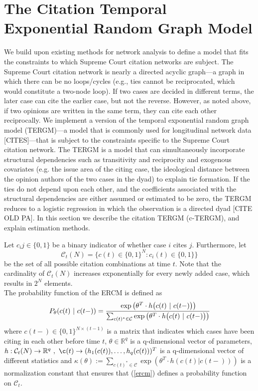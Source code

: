 \documentclass[headsepline=true, abstracton]{scrartcl}
\begin{document}
 \section{The Citation Temporal Exponential Random Graph Model}
We build upon existing methods for network analysis to define a model that fits the constraints to which Supreme Court citation networks are subject. The Supreme Court citation network is nearly a directed acyclic graph---a graph in which there can be no loops/cycles (e.g., ties cannot be reciprocated, which would constitute a two-node loop). If two cases are decided in different terms, the later case can cite the earlier case, but not the reverse. However, as noted above, if two opinions are written in the same term, they can cite each other reciprocally. We implement a version of the temporal exponential random graph model (TERGM)---a model that is commonly used for longitudinal network data [CITES]---that is subject to the constraints specific to the Supreme Court citation network. The TERGM is a model that can simultaneously incorporate structural dependencies such as transitivity and reciprocity and exogenous covariates  (e.g. the issue area of the citing case, the ideological distance between the opinion authors of the two cases in the dyad) to explain tie formation. If the ties do not depend upon each other, and the coefficients associated with the structural dependencies are either assumed or estimated to be zero, the TERGM reduces to a logistic regression in which the observation is a directed dyad [CITE OLD PA].  In this section we describe the citation TERGM (c-TERGM), and explain estimation methods. 

Let $c_ij \in \{0,1\}$ be a binary indicator of whether case $i$ cites $j$. Furthermore, let
$$\mathcal{C}_t(N)=\{c(t)\in \{0,1\}^N: c_i(t)\in \{0,1\} \}$$ 
be the set of all possible citation combinations at time $t$. Note that the cardinality of $\mathcal{C}_t(N)$ increases exponentially for every newly added case, which results in $2^N$ elements.\\
The probability function of the ERCM is defined as
\begin{equation}
P_{\theta}(c(t)~|~c(t-))=\cfrac{\exp\big(\theta^T\cdot h\big(c(t)~|~c(t-)\big)\big)}{\sum_{c(t)^*\in \mathcal{C}}\exp\big(\theta^T\cdot h\big(c(t)~|~c(t-)\big)\big)}
\label{ercm}
\end{equation}
where $c(t-)\in \{0,1\}^{N \times (t-1)}$ is a matrix that indicates which cases have been citing in each other before time $t$, $\theta \in \mathbb{R}^q$ is a q-dimensional vector of parameters,  $h: \mathcal{C}_t(N) \to \mathbb{R}^q ~, ~ \c(t) \to (h_1(c(t)), \dots , h_q(c(t)))^T$ is a q-dimensional vector of different statistics and $\kappa(\theta) := \sum_{c(t)^*\in \mathcal{C}}\exp(\theta^T\cdot h(c(t)|c(t-)))$ is a normalization constant that ensures that (\ref{ercm}) defines a probability function on $\mathcal{C}_t$.\\[0.3cm]
\end{document}
